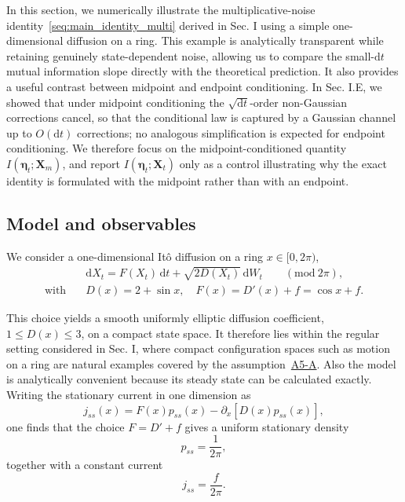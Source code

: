 \documentclass[
 longbibliography,
 twocolumn,
 superscriptaddress,
 amsmath,
 amssymb,
 amsthm,
 amsfonts,
 prl,
 floatfix,
]{revtex4-2}
\begin{document}
\begin{widetext}
In this section, we numerically illustrate the multiplicative-noise identity~\eqref{seq:main_identity_multi} derived in Sec. I using a simple one-dimensional diffusion on a ring. This example is analytically transparent while retaining genuinely state-dependent noise, allowing us to compare the small-$\mathrm dt$ mutual information slope directly with the theoretical prediction. It also provides a useful contrast between midpoint and endpoint conditioning. In Sec. I.E, we showed that under midpoint conditioning the $\sqrt{\mathrm dt}$-order non-Gaussian corrections cancel, so that the conditional law is captured by a Gaussian channel up to $O(\mathrm dt)$ corrections; no analogous simplification is expected for endpoint conditioning. We therefore focus on the midpoint-conditioned quantity $I(\bm\eta_t;\bm X_m)$, and report $I(\bm\eta_t;\bm X_t)$ only as a control illustrating why the exact identity is formulated with the midpoint rather than with an endpoint. 

\vspace*{-0.6\baselineskip}
\subsection{Model and observables}
\vspace*{-0.6\baselineskip}

We consider a one-dimensional It\^{o} diffusion on a ring $x\in[0,2\pi)$,
\begin{equation}
\begin{aligned}
    &\mathrm d X_t
    =F(X_t)\,\mathrm dt
    +\sqrt{2D(X_t)}\,\mathrm dW_t
    \qquad(\mathrm{mod}\ 2\pi),
    \\
    \text{with}\quad&
    D(x)=2+\sin x,
    \quad F(x)=D'(x)+f=\cos x+f.
\end{aligned}
\label{seq:1D_ring_model}
\end{equation}

This choice yields a smooth uniformly elliptic diffusion coefficient, $1\leq D(x)\leq3$, on a compact state space. It therefore lies within the regular setting considered in Sec. I, where compact configuration spaces such as motion on a ring are natural examples covered by the assumption~\hyperlink{assumption:A5-A}{A5-A}. Also the model is analytically convenient because its steady state can be calculated exactly. Writing the stationary current in one dimension as
\[
    j_{ss}(x)=F(x)p_{ss}(x)-\partial_x[D(x)p_{ss}(x)],
\]
one finds that the choice $F=D'+f$ gives a uniform stationary density
\[
    p_{ss}=\frac{1}{2\pi},
\]
together with a constant current
\[
j_{ss}=\frac{f}{2\pi}.
\]


\end{widetext}
\end{document}
